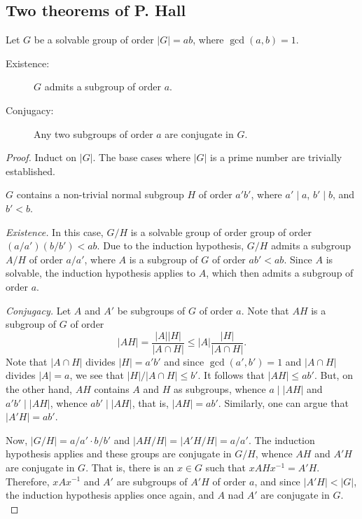 \subsection{Two theorems of P. Hall}

\begin{theorem}[Hall]
    Let $G$ be a solvable group of order $|G| = ab$, where $\gcd(a, b) = 1$.
    \begin{description}
        \item[Existence:] $G$ admits a subgroup of order $a$.
        \item[Conjugacy:] Any two subgroups of order $a$ are conjugate in $G$.
    \end{description}
\end{theorem}
\begin{proof}
    Induct on $|G|$. The base cases where $|G|$ is a prime number are trivially established.

    \noindent{} $G$ contains a non-trivial normal subgroup $H$ of order $a'b'$, where $a'\mid a$, $b'\mid b$, and $b' < b$.

    \noindent\emph{Existence.} In this case, $G/H$ is a solvable group of order group of order $(a/a')(b/b') < ab$. Due to the induction hypothesis, $G/H$ admits a subgroup $A/H$ of order $a/a'$, where $A$ is a subgroup of $G$ of order $ab' < ab$. Since $A$ is solvable, the induction hypothesis applies to $A$, which then admits a subgroup of order $a$.

    \noindent\emph{Conjugacy.} Let $A$ and $A'$ be subgroups of $G$ of order $a$. Note that $AH$ is a subgroup of $G$ of order 
    \begin{equation*}
        |AH| = \frac{|A| |H|}{|A\cap H|}\le|A|\frac{|H|}{|A\cap H|}.
    \end{equation*}
    Note that $|A\cap H|$ divides $|H| = a'b'$ and since $\gcd(a', b') = 1$ and $|A\cap H|$ divides $|A| = a$, we see that $|H|/|A\cap H|\le b'$. It follows that $|AH|\le ab'$. But, on the other hand, $AH$ contains $A$ and $H$ as subgroups, whence $a\mid |AH|$ and $a'b'\mid |AH|$, whence $ab'\mid |AH|$, that is, $|AH| = ab'$. Similarly, one can argue that $|A'H| = ab'$.

    Now, $|G/H| = a/a'\cdot b/b'$ and $|AH/H| = |A'H/H| = a/a'$. The induction hypothesis applies and these groups are conjugate in $G/H$, whence $AH$ and $A'H$ are conjugate in $G$. That is, there is an $x\in G$ such that $x AH x^{-1} = A'H$. Therefore, $xAx^{-1}$ and $A'$ are subgroups of $A'H$ of order $a$, and since $|A'H| < |G|$, the induction hypothesis applies once again, and $A$ nad $A'$ are conjugate in $G$.\\


\end{proof}
